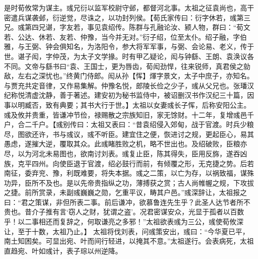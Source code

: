 \documentclass[12pt,UTF8]{ctexbook}
\begin{document}
是时荀攸常为谋主。彧兄衍以监军校尉守邺，都督河北事。太祖之征袁尚也，高干密遣兵谋袭邺，衍逆觉，尽诛之，以功封列侯。【荀氏家传曰：衍字休若，彧第三兄。彧第四兄谌，字友若，事见袁绍传。陈群与孔融论汝、颍人物，群曰：“荀文若、公达、休若、友若、仲豫，当今并无对。”衍子绍，位至太仆。绍子融，字伯雅，与王弼、钟会俱知名，为洛阳令，参大将军军事，与弼、会论易、老义，传于世。谌子闳，字仲茂，为太子文学掾。时有甲乙疑论，闳与钟繇、王朗、袁涣议各不同。文帝与繇书曰“袁、王国士，更为唇齿，荀闳劲悍，往来锐师，真君侯之勍敌，左右之深忧也。”终黄门侍郎。闳从孙【恽】煇字景文，太子中庶子，亦知名。与贾充共定音律，又作易集解。仲豫名悦，郎陵长俭之少子，彧从父兄也。张璠汉纪称悦清虚沈静，善于著述。建安初为秘书监侍中，被诏删汉书作汉纪三十篇，因事以明臧否，致有典要；其书大行于世。】太祖以女妻彧长子恽，后称安阳公主。彧及攸并贵重，皆谦冲节俭，禄赐散之宗族知旧，家无馀财。十二年，复增彧邑千户，合二千户。【彧别传曰：太祖又表曰：“昔袁绍侵入郊甸，战于官渡。时兵少粮尽，图欲还许，书与彧议，彧不听臣。建宜住之便，恢进讨之规，更起臣心，易其愚虑，遂摧大逆，覆取其众。此彧睹胜败之机，略不世出也。及绍破败，臣粮亦尽，以为河北未易图也，欲南讨刘表。彧复止臣，陈其得失，臣用反旆，遂吞凶族，克平四州。向使臣退于官渡，绍必鼓行而前，有倾覆之形，无克捷之势。后若南征，委弃兖、豫，利既难要，将失本据。彧之二策，以亡为存，以祸致福，谋殊功异，臣所不及也。是以先帝贵指纵之功，薄搏获之赏；古人尚帷幄之规，下攻拔之捷。前所赏录，未副彧巍巍之勋，乞重平议，畴其户邑。”彧深辞让，太祖报之曰：“君之策谋，非但所表二事。前后谦冲，欲慕鲁连先生乎？此圣人达节者所不贵也。昔介子推有言‘窃人之财，犹谓之盗’。况君密谋安众，光显于孤者以百数乎！以二事相还而复辞之，何取谦亮之多邪！”太祖欲表彧为三公，彧使荀攸深让，至于十数，太祖乃止。】
太祖将伐刘表，问彧策安出，彧曰：“今华夏已平，南土知困矣。可显出宛、叶而间行轻进，以掩其不意。”太祖遂行。会表病死，太祖直趋宛、叶如彧计，表子琮以州逆降。
\end{document}
